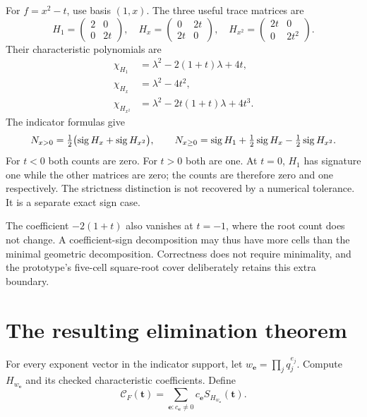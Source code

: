 For $f=x^2-t$, use basis $(1,x)$. The three useful trace matrices are
\begin{equation}\label{eq:sqrtmatrices}
H_1=\begin{pmatrix}2&0\\0&2t\end{pmatrix},\quad
H_x=\begin{pmatrix}0&2t\\2t&0\end{pmatrix},\quad
H_{x^2}=\begin{pmatrix}2t&0\\0&2t^2\end{pmatrix}.
\end{equation}
Their characteristic polynomials are
\begin{align*}
\chi_{H_1}&=\lambda^2-2(1+t)\lambda+4t,\\
\chi_{H_x}&=\lambda^2-4t^2,\\
\chi_{H_{x^2}}&=\lambda^2-2t(1+t)\lambda+4t^3.
\end{align*}
The indicator formulas give
\[
N_{x>0}=\tfrac12\bigl(\operatorname{sig} H_x+\operatorname{sig} H_{x^2}\bigr),\qquad
N_{x\geq0}=\operatorname{sig} H_1+\tfrac12\operatorname{sig} H_x-\tfrac12\operatorname{sig} H_{x^2}.
\]
For $t<0$ both counts are zero. For $t>0$ both are one. At $t=0$, $H_1$ has signature one while the other matrices are zero; the counts are therefore zero and one respectively. The strictness distinction is not recovered by a numerical tolerance. It is a separate exact sign case.

The coefficient $-2(1+t)$ also vanishes at $t=-1$, where the root count does not change. A coefficient-sign decomposition may thus have more cells than the minimal geometric decomposition. Correctness does not require minimality, and the prototype's five-cell square-root cover deliberately retains this extra boundary.

\section{The resulting elimination theorem}\label{sec:elimination}

For every exponent vector in the indicator support, let $w_{\bm e}=\prod_jq_j^{e_j}$. Compute $H_{w_{\bm e}}$ and its checked characteristic coefficients. Define
\begin{equation}\label{eq:countcircuit}
\mathcal C_F(\bm t)=\sum_{\bm e:c_{\bm e}\ne0}c_{\bm e}S_{H_{w_{\bm e}}}(\bm t).
\end{equation}

